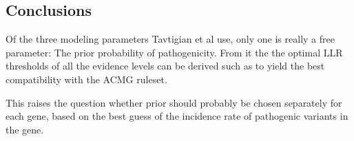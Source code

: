 \documentclass[12pt]{article}
\begin{document}
\subsection*{Conclusions}

Of the three modeling parameters Tavtigian et al use, only one is really a
free parameter: The prior probability of pathogenicity. From it the the optimal
LLR thresholds of all the evidence levels can be derived such as to yield the
best compatibility with the ACMG ruleset.

This raises the question whether prior should probably be chosen separately
for each gene, based on the best guess of the incidence rate of pathogenic
variants in the gene.
\end{document}

